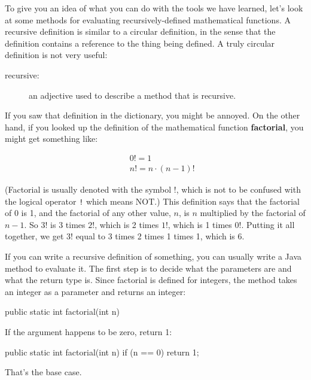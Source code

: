 To give you an idea of what you can do with the tools we have learned,
let's look at some methods for evaluating recursively-defined
mathematical functions.  A recursive definition is similar to a
circular definition, in the sense that the definition contains a
reference to the thing being defined.  A truly circular definition is
not very useful:

\begin{description}

\item[recursive:] an adjective used to describe a method that is recursive.

\end{description}

If you saw that definition in the dictionary, you might be
annoyed.  On the other hand, if you looked up the definition
of the mathematical function {\bf factorial}, you might
get something like:

\begin{eqnarray*}
&&  0! = 1 \\
&&  n! = n \cdot(n-1)!
\end{eqnarray*}

(Factorial is usually denoted with the symbol $!$, which is
not to be confused with the logical operator {\tt !} which
means NOT.)  This definition says that the factorial of 0 is 1,
and the factorial of any other value, $n$, is $n$ multiplied
by the factorial of $n-1$.  So $3!$ is 3 times $2!$, which is 2 times
$1!$, which is 1 times $0!$.  Putting it all together, we get
$3!$ equal to 3 times 2 times 1 times 1, which is 6.

If you can write a recursive definition of something, you can usually
write a Java method to evaluate it.  The first step is to decide what
the parameters are and what the return type is.  Since factorial is
defined for integers, the method takes an
integer as a parameter and returns an integer:

\begin{code}
  public static int factorial(int n) {
  }
\end{code}

\noindent If the argument happens to be zero, return 1:

\begin{code}
  public static int factorial(int n) {
    if (n == 0) {
      return 1;
    }
  }
\end{code}

That's the base case.

